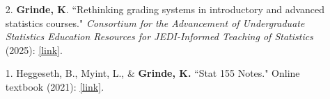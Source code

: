 \documentclass[margin]{res}
\newcommand{\annotateItem}[1]{
	\begin{itemize} \vspace{-0.1cm}
	\item[] 
	\begin{footnotesize}\textcolor{black}{(#1)}\end{footnotesize}
	\end{itemize} \vspace{-0.1cm}
}
\begin{document}
\begin{resume}
\begin{itemize}
\item[2.] \textbf{Grinde, K}. ``Rethinking grading systems in introductory and advanced statistics courses." \textit{Consortium for the Advancement of Undergraduate Statistics Education Resources for JEDI-Informed Teaching of Statistics} (2025): \href{https://causeweb.org/jedi/post/rethinking-grading-systems}{[link]}.

\item[1.] Heggeseth, B., Myint, L., \& \textbf{Grinde, K.} ``Stat 155 Notes." Online textbook (2021): \href{https://mac-stat.github.io/Stat155Notes/}{[link]}.  

\end{itemize}



\end{resume}
\end{document}
